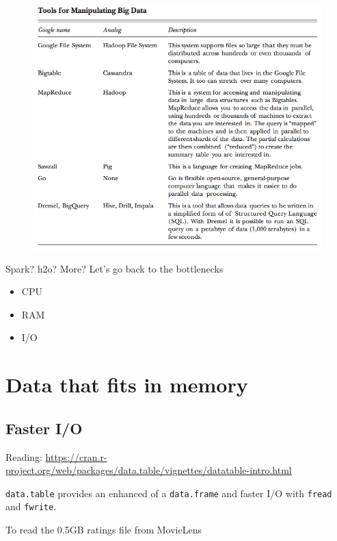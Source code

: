 \documentclass[]{book}
\providecommand{\tightlist}{%
  \setlength{\itemsep}{0pt}\setlength{\parskip}{0pt}}
\theoremstyle{definition}
\theoremstyle{definition}
\theoremstyle{definition}
\theoremstyle{remark}
\begin{document}
\begin{figure}

{\centering \includegraphics[width=10.39in]{images/ch6_tool_list} 

}

\end{figure}

Spark? h2o? More? Let's go back to the bottlenecks

\begin{itemize}
\tightlist
\item
  CPU
\item
  RAM
\item
  I/O
\end{itemize}

\section{Data that fits in memory}\label{data-that-fits-in-memory}

\subsection{Faster I/O}\label{faster-io}

Reading:
\url{https://cran.r-project.org/web/packages/data.table/vignettes/datatable-intro.html}

\texttt{data.table} provides an enhanced of a \texttt{data.frame} and
faster I/O with \texttt{fread} and \texttt{fwrite}.

To read the 0.5GB ratings file from MovieLens
\end{document}
